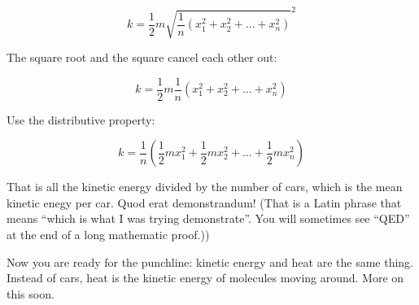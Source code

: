 $$k = \frac{1}{2}m \sqrt{\frac{1}{n}\left( x_1^2 + x_2^2 + \ldots + x_n^2 \right)}^2$$

The square root and the square cancel each other out:

$$k = \frac{1}{2}m \frac{1}{n}\left( x_1^2 + x_2^2 + \ldots + x_n^2 \right)$$

Use the distributive property:

$$k = \frac{1}{n} \left( \frac{1}{2} m x_1^2 + \frac{1}{2}m x_2^2 + \ldots + \frac{1}{2}m x_n^2 \right)$$


That is all the kinetic energy divided by the number of cars, which is
the mean kinetic enegy per car. Quod erat demonstrandum! (That is a
Latin phrase that means ``which is what I was trying
demonstrate''. You will sometimes see ``QED'' at the end of a long
mathematic proof.))

Now you are ready for the punchline: kinetic energy and heat are the
same thing. Instead of cars, heat is the kinetic energy of molecules
moving around. More on this soon.
